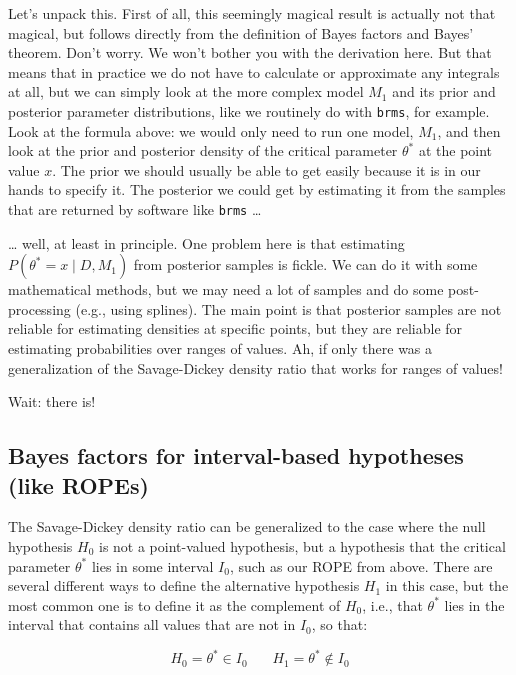 \documentclass[
  doc,
  floatsintext,
  longtable,
  nolmodern,
  notxfonts,
  notimes,
  colorlinks=true,linkcolor=blue,citecolor=blue,urlcolor=blue]{apa7}
\begin{document}
Let's unpack this. First of all, this seemingly magical result is
actually not that magical, but follows directly from the definition of
Bayes factors and Bayes' theorem. Don't worry. We won't bother you with
the derivation here. But that means that in practice we do not have to
calculate or approximate any integrals at all, but we can simply look at
the more complex model \(M_1\) and its prior and posterior parameter
distributions, like we routinely do with \texttt{brms}, for example.
Look at the formula above: we would only need to run one model, \(M_1\),
and then look at the prior and posterior density of the critical
parameter \(\theta^*\) at the point value \(x\). The prior we should
usually be able to get easily because it is in our hands to specify it.
The posterior we could get by estimating it from the samples that are
returned by software like \texttt{brms} \ldots{}

\ldots{} well, at least in principle. One problem here is that
estimating \(P(\theta^*=x \mid D, M_1)\) from posterior samples is
fickle. We can do it with some mathematical methods, but we may need a
lot of samples and do some post-processing (e.g., using splines). The
main point is that posterior samples are not reliable for estimating
densities at specific points, but they are reliable for estimating
probabilities over ranges of values. Ah, if only there was a
generalization of the Savage-Dickey density ratio that works for ranges
of values!

Wait: there is!

\subsection{Bayes factors for interval-based hypotheses (like
ROPEs)}\label{bayes-factors-for-interval-based-hypotheses-like-ropes}

The Savage-Dickey density ratio can be generalized to the case where the
null hypothesis \(H_0\) is not a point-valued hypothesis, but a
hypothesis that the critical parameter \(\theta^*\) lies in some
interval \(I_0\), such as our ROPE from above. There are several
different ways to define the alternative hypothesis \(H_1\) in this
case, but the most common one is to define it as the complement of
\(H_0\), i.e., that \(\theta^*\) lies in the interval that contains all
values that are not in \(I_0\), so that:

\[
H_0 = \theta^* \in I_0 \ \ \ \ \ \ \ \  H_1 = \theta^* \not \in I_0
\]
\end{document}
